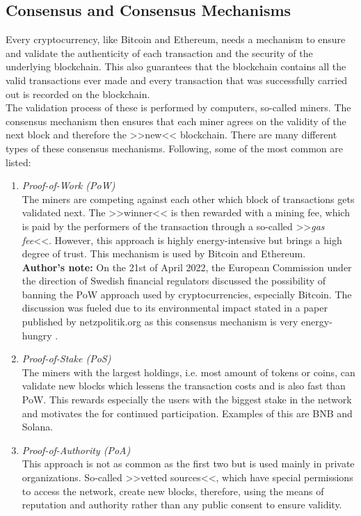 \documentclass[a4paper,12pt]{report}
\begin{document}
	    \subsection[Consensus and Consensus Mechanisms]{Consensus and Consensus Mechanisms \parencite{ER21}} \label{ConsMechs}
	    \startsubsection
	        Every cryptocurrency, like Bitcoin and Ethereum, needs a mechanism to ensure and validate the authenticity of each transaction and the security of the underlying blockchain. This also guarantees that the blockchain contains all the valid transactions ever made and every transaction that was successfully carried out is recorded on the blockchain. \\
	        The validation process of these is performed by computers, so-called miners. The consensus mechanism then ensures that each miner agrees on the validity of the next block and therefore the >>new<< blockchain. There are many different types of these consensus mechanisms. Following, some of the most common are listed:
	        \begin{enumerate}
	            \item \textit{Proof-of-Work (PoW)} \\
	            The miners are competing against each other which block of transactions gets validated next. The >>winner<< is then rewarded with a mining fee, which is paid by the performers of the transaction through a so-called >>\textit{gas fee}<<. However, this approach is highly energy-intensive but brings a high degree of trust. This mechanism is used by Bitcoin and Ethereum. \\
	            \textbf{Author's note:} On the 21st of April 2022, the European Commission under the direction of Swedish financial regulators discussed the possibility of banning the PoW approach used by cryptocurrencies, especially Bitcoin. The discussion was fueled due to its environmental impact stated in a paper published by netzpolitik.org as this consensus mechanism is very energy-hungry \parencite{EUPoW}.
	            \item \textit{Proof-of-Stake (PoS)} \\
	            The miners with the largest holdings, i.e. most amount of tokens or coins, can validate new blocks which lessens the transaction costs and is also fast than PoW. This rewards especially the users with the biggest stake in the network and motivates the for continued participation. Examples of this are BNB and Solana.
	            \item \textit{Proof-of-Authority (PoA)} \\
	            This approach is not as common as the first two but is used mainly in private organizations. So-called >>vetted sources<<, which have special permissions to access the network, create new blocks, therefore, using the means of reputation and authority rather than any public consent to ensure validity.
	        \end{enumerate}
	    \closesection
	\closesection
	
\end{document}

